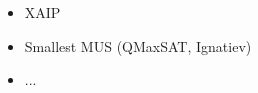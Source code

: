 \begin{itemize}
    \item XAIP
    \item Smallest MUS (QMaxSAT, Ignatiev)
    \item ...
\end{itemize}